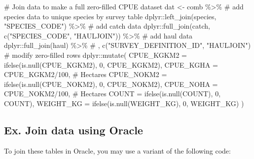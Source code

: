 \documentclass[
  letterpaper,
  oneside,
  open=any]{scrbook}
\newenvironment{Shaded}{\begin{snugshade}}{\end{snugshade}}
\newcommand{\AttributeTok}[1]{\textcolor[rgb]{0.40,0.45,0.13}{#1}}
\newcommand{\CommentTok}[1]{\textcolor[rgb]{0.37,0.37,0.37}{#1}}
\newcommand{\DecValTok}[1]{\textcolor[rgb]{0.68,0.00,0.00}{#1}}
\newcommand{\FunctionTok}[1]{\textcolor[rgb]{0.28,0.35,0.67}{#1}}
\newcommand{\NormalTok}[1]{\textcolor[rgb]{0.00,0.23,0.31}{#1}}
\newcommand{\OtherTok}[1]{\textcolor[rgb]{0.00,0.23,0.31}{#1}}
\newcommand{\SpecialCharTok}[1]{\textcolor[rgb]{0.37,0.37,0.37}{#1}}
\newcommand{\StringTok}[1]{\textcolor[rgb]{0.13,0.47,0.30}{#1}}
\begin{document}
\begin{Shaded}
\begin{Highlighting}[]
\CommentTok{\# Join data to make a full zero{-}filled CPUE dataset}
\NormalTok{dat }\OtherTok{\textless{}{-}}\NormalTok{ comb }\SpecialCharTok{\%\textgreater{}\%} 
  \CommentTok{\# add species data to unique species by survey table}
\NormalTok{  dplyr}\SpecialCharTok{::}\FunctionTok{left\_join}\NormalTok{(species, }\StringTok{"SPECIES\_CODE"}\NormalTok{) }\SpecialCharTok{\%\textgreater{}\%} 
  \CommentTok{\# add catch data}
\NormalTok{  dplyr}\SpecialCharTok{::}\FunctionTok{full\_join}\NormalTok{(catch, }\FunctionTok{c}\NormalTok{(}\StringTok{"SPECIES\_CODE"}\NormalTok{, }\StringTok{"HAULJOIN"}\NormalTok{)) }\SpecialCharTok{\%\textgreater{}\%} 
  \CommentTok{\# add haul data}
\NormalTok{  dplyr}\SpecialCharTok{::}\FunctionTok{full\_join}\NormalTok{(haul) }\SpecialCharTok{\%\textgreater{}\%} \CommentTok{\# , c("SURVEY\_DEFINITION\_ID", "HAULJOIN")}
  \CommentTok{\# modify zero{-}filled rows}
\NormalTok{  dplyr}\SpecialCharTok{::}\FunctionTok{mutate}\NormalTok{(}
    \AttributeTok{CPUE\_KGKM2 =} \FunctionTok{ifelse}\NormalTok{(}\FunctionTok{is.null}\NormalTok{(CPUE\_KGKM2), }\DecValTok{0}\NormalTok{, CPUE\_KGKM2),}
    \AttributeTok{CPUE\_KGHA =}\NormalTok{ CPUE\_KGKM2}\SpecialCharTok{/}\DecValTok{100}\NormalTok{, }\CommentTok{\# Hectares}
    \AttributeTok{CPUE\_NOKM2 =} \FunctionTok{ifelse}\NormalTok{(}\FunctionTok{is.null}\NormalTok{(CPUE\_NOKM2), }\DecValTok{0}\NormalTok{, CPUE\_NOKM2),}
    \AttributeTok{CPUE\_NOHA =}\NormalTok{ CPUE\_NOKM2}\SpecialCharTok{/}\DecValTok{100}\NormalTok{, }\CommentTok{\# Hectares}
    \AttributeTok{COUNT =} \FunctionTok{ifelse}\NormalTok{(}\FunctionTok{is.null}\NormalTok{(COUNT), }\DecValTok{0}\NormalTok{, COUNT),}
    \AttributeTok{WEIGHT\_KG =} \FunctionTok{ifelse}\NormalTok{(}\FunctionTok{is.null}\NormalTok{(WEIGHT\_KG), }\DecValTok{0}\NormalTok{, WEIGHT\_KG) ) }
\end{Highlighting}
\end{Shaded}

\hypertarget{ex.-join-data-using-oracle}{%
\subsection{Ex. Join data using
Oracle}\label{ex.-join-data-using-oracle}}

To join these tables in Oracle, you may use a variant of the following
code:
\end{document}
